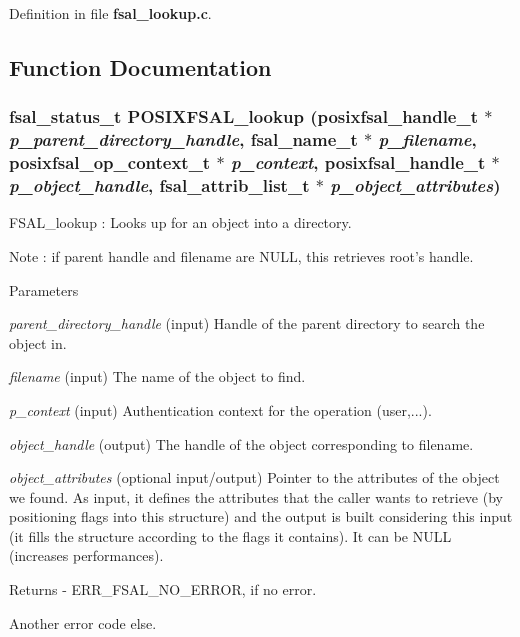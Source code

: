 Definition in file {\bf fsal\_\-lookup.c}.

\subsection{Function Documentation}
\subsubsection[{POSIXFSAL\_\-lookup}]{\setlength{\rightskip}{0pt plus 5cm}fsal\_\-status\_\-t POSIXFSAL\_\-lookup (posixfsal\_\-handle\_\-t $\ast$ {\em p\_\-parent\_\-directory\_\-handle}, \/  fsal\_\-name\_\-t $\ast$ {\em p\_\-filename}, \/  posixfsal\_\-op\_\-context\_\-t $\ast$ {\em p\_\-context}, \/  posixfsal\_\-handle\_\-t $\ast$ {\em p\_\-object\_\-handle}, \/  fsal\_\-attrib\_\-list\_\-t $\ast$ {\em p\_\-object\_\-attributes})}\label{fsal__lookup_8c_a51c5f205cfd9a8a55a2452c7e4dde143}
FSAL\_\-lookup : Looks up for an object into a directory.

Note : if parent handle and filename are NULL, this retrieves root's handle.


\begin{DoxyParams}{Parameters}
\item[{\em parent\_\-directory\_\-handle}](input) Handle of the parent directory to search the object in. \item[{\em filename}](input) The name of the object to find. \item[{\em p\_\-context}](input) Authentication context for the operation (user,...). \item[{\em object\_\-handle}](output) The handle of the object corresponding to filename. \item[{\em object\_\-attributes}](optional input/output) Pointer to the attributes of the object we found. As input, it defines the attributes that the caller wants to retrieve (by positioning flags into this structure) and the output is built considering this input (it fills the structure according to the flags it contains). It can be NULL (increases performances).\end{DoxyParams}
\begin{DoxyReturn}{Returns}
-\/ ERR\_\-FSAL\_\-NO\_\-ERROR, if no error.
\begin{DoxyItemize}
\item Another error code else. 
\end{DoxyItemize}
\end{DoxyReturn}


